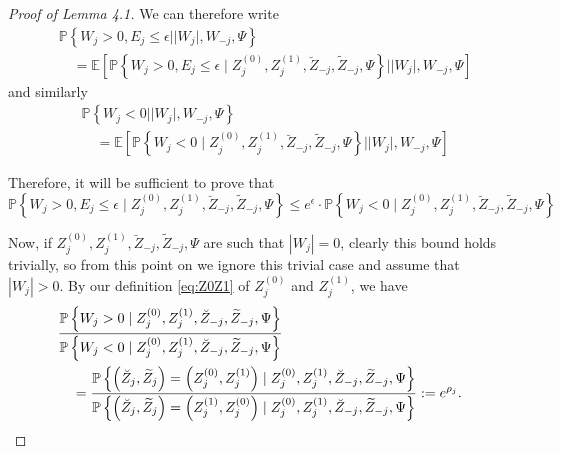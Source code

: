 ﻿\documentclass[12pt]{article}
\newcommand{\0}{\mbox{\bf 0}}
\theoremstyle{plain}%
\theoremstyle{definition}
\begin{document}
{\begin{proof}[Proof of Lemma 4.1]
We can therefore write 
\begin{align*}
& \mathbb{P}\left\{ W_{j}>0,E_{j}\leq \epsilon ||W_{j}|,W_{-j},\Psi \right\}
\\
& \quad =\mathbb{E}\left[ \mathbb{P}\left\{ W_{j}>0,E_{j}\leq \epsilon \mid
Z_{j}^{(0)},Z_{j}^{(1)},\breve{Z}_{-j},\widetilde{Z}_{-j},\Psi \right\}
||W_{j}| ,W_{-j},\Psi \right]
\end{align*}
and similarly 
\begin{align*}
& \mathbb{P}\left\{ W_{j}<0||W_{j}|,W_{-j},\Psi \right\} \\
& \quad =\mathbb{E}\left[ \mathbb{P}\left\{ W_{j}<0\mid
Z_{j}^{(0)},Z_{j}^{(1)},\breve{Z}_{-j},\widetilde{Z}_{-j},\Psi \right\}
||W_{j}|,W_{-j},\Psi \right]
\end{align*}

Therefore, it will be sufficient to prove that 
\begin{equation}  \label{eq:flip2}
\mathbb{P}\left\{ W_{j}>0,E_{j}\leq \epsilon \mid Z_{j}^{(0)},Z_{j}^{(1)}, 
\breve{Z}_{-j},\widetilde{Z}_{-j},\Psi \right\} \leq e^{\epsilon }\cdot 
\mathbb{P}\left\{ W_{j}<0\mid Z_{j}^{(0)},Z_{j}^{(1)},\breve{Z}_{-j}, 
\widetilde{Z}_{-j},\Psi \right\}
\end{equation}

Now, if $Z_{j}^{(0)},Z_{j}^{(1)},\breve{Z}_{-j},\widetilde{Z}_{-j},\Psi $
are such that $\left\vert W_{j}\right\vert =0$, clearly this bound holds
trivially, so from this point on we ignore this trivial case and assume that 
$\left\vert W_{j}\right\vert >0$. By our definition \eqref{eq:Z0Z1} of $%
Z_{j}^{(0)}$ and $Z_{j}^{(1)}$, we have 
\begin{align}  \label{eq:rho_j}
& \frac{\mathbb{P}\left\{ W_{j}>0\mid Z_{j}^{(0)},Z_{j}^{(1)},\breve{Z}%
_{-j}, \widetilde{Z}_{-j},\Psi \right\} }{\mathbb{P}\left\{ W_{j}<0\mid
Z_{j}^{(0)},Z_{j}^{(1)},\breve{Z}_{-j},\widetilde{Z}_{-j},\Psi \right\} } 
\notag \\
& \quad =\frac{\mathbb{P}\left\{ \left( \breve{Z}_{j},\widetilde{Z}
_{j}\right) =\left( Z_{j}^{(0)},Z_{j}^{(1)}\right) \mid
Z_{j}^{(0)},Z_{j}^{(1)},\breve{Z}_{-j},\widetilde{Z}_{-j},\Psi \right\} }{ 
\mathbb{P}\left\{ \left( \breve{Z}_{j},\widetilde{Z}_{j}\right) =\left(
Z_{j}^{(1)},Z_{j}^{(0)}\right) \mid Z_{j}^{(0)},Z_{j}^{(1)},\breve{Z}_{-j}, 
\widetilde{Z}_{-j},\Psi \right\} }:=e^{\rho _{j}}.
\end{align}


\end{proof}}
\end{document}
